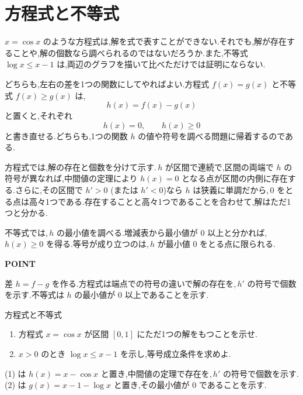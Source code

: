 \section{方程式と不等式}\label{節:微分方程式不等式}
$x=\cos x$ のような方程式は,解を式で表すことができない.それでも,解が存在することや,解の個数なら調べられるのではないだろうか.また,不等式 $\log x\le x-1$ は,両辺のグラフを描いて比べただけでは証明にならない.

どちらも,左右の差を1つの関数にしてやればよい.方程式 $f(x)=g(x)$ と不等式 $f(x)\ge g(x)$ は,
\[
 h(x)=f(x)-g(x)
\]
と置くと,それぞれ
\[
 h(x)=0,\qquad h(x)\ge0
\]
と書き直せる.どちらも,1つの関数 $h$ の値や符号を調べる問題に帰着するのである.

方程式では,解の存在と個数を分けて示す.\,$h$ が区間で連続で,区間の両端で $h$ の符号が異なれば,中間値の定理により $h(x)=0$ となる点が区間の内側に存在する.さらに,その区間で $h'>0$ (または $h'<0$)なら $h$ は狭義に単調だから,\,$0$ をとる点は高々1つである.存在することと高々1つであることを合わせて,解はただ1つと分かる.

不等式では,\,$h$ の最小値を調べる.増減表から最小値が $0$ 以上と分かれば,\,$h(x)\ge0$ を得る.等号が成り立つのは,\,$h$ が最小値 $0$ をとる点に限られる.

\begin{bookpoint}
\textbf{POINT}\par
差 $h=f-g$ を作る.方程式は端点での符号の違いで解の存在を,\,$h'$ の符号で個数を示す.不等式は $h$ の最小値が $0$ 以上であることを示す.
\end{bookpoint}

\begin{example}{方程式と不等式}
\begin{enumerate}[label=(\arabic*),leftmargin=*]
 \item 方程式 $x=\cos x$ が区間 $[0,1]$ にただ1つの解をもつことを示せ.
 \item $x>0$ のとき $\log x\le x-1$ を示し,等号成立条件を求めよ.
\end{enumerate}
\end{example}
(1) は $h(x)=x-\cos x$ と置き,中間値の定理で存在を,\,$h'$ の符号で個数を示す.(2) は $g(x)=x-1-\log x$ と置き,その最小値が $0$ であることを示す.


